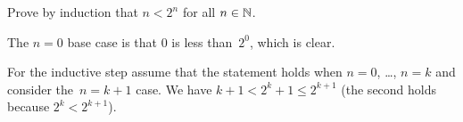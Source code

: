 \documentclass{test}  %
\begin{document}
\begin{problem}
\end{problem}

\begin{problem}
Prove by induction that $n<2^n$ for all $n\in\mathbb{N}$.  
\begin{ans}
The $n=0$ base case is that $0$ is less than~$2^0$, which is clear.

For the inductive step assume that the statement holds when 
$n=0$, \ldots, $n=k$ and consider the~$n=k+1$ case.
We have $k+1<2^k+1\leq 2^{k+1}$ (the second holds because $2^k<2^{k+1}$). 
\end{ans}
\end{problem}
\end{document}
